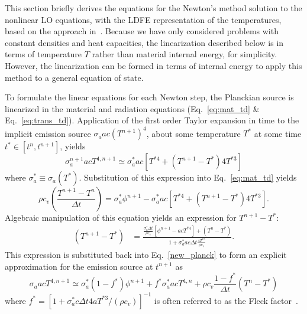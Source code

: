 This section briefly derives the equations for the Newton's method solution to the nonlinear LO equations, with the LDFE representation of the temperatures, based on the approach in~\cite{morel_ldtrt}.
Because we have only considered problems with constant densities and heat capacities, the
linearization described below is in terms of temperature $T$ rather than material internal
energy, for simplicity. However, the linearization can be formed in terms of internal energy
to apply this method to a general equation of state.

To formulate the linear equations for each Newton step, the Planckian source is linearized in the material and radiation equations (Eq.~\eqref{eq:mat_td}
\& Eq.~\eqref{eq:trans_td}). 
Application of the first order Taylor expansion in time to the
implicit emission source $\sigma_a a c (T^{n+1})^4$, about some temperature $T^*$ at some
time $t^*\in[t^{n},t^{n+1}]$, yields
\begin{equation}\label{new_planck}
    \sigma_a^{n+1} a c T^{4,n+1} \simeq \sigma_a^* a c \left[T^{*4} + (T^{n+1} - T^*) 4T^{*3} \right]
\end{equation}
where $\sigma_a^*\equiv\sigma_a(T^*)$.  Substitution of this expression into Eq.~\eqref{eq:mat_td} yields
\begin{equation}
    \rho c_v \left( \frac{T^{n+1} - T^{n}}{\Delta t} \right) = \sigma_a^* \phi^{n+1} -
    \sigma_a^* a c \left[ T^{*4} +  (T^{n+1} - T^*) 4T^{*3} \right].
\end{equation}
Algebraic manipulation of this equation yields an expression for $T^{n+1} - T^{*}$:
\begin{align*}
\left( T^{n+1} - T^* \right) &= \frac{ {\displaystyle \frac{\sigma_a^* \Delta t}{\rho
c_v}}  \left[ \phi^{n+1} -  a c T^{*4} \right] + (T^n - T^*) }{1 +
        \sigma_a^* a c \Delta t\frac{\displaystyle 4
T^{*3}}{\displaystyle \rho c_v } }.
\end{align*}
This expression is substituted back into Eq.~\eqref{new_planck} to form
an explicit approximation for the emission source at $t^{n+1}$ as
\begin{equation}\label{t_next1}
    \sigma_a a c T^{4,n+1} \simeq \sigma_a^* (1 -f^*) \phi^{n+1}
    + f^* \sigma_a^* a c T^{4,n} + \rho c_v\frac{1-f^*}{\Delta t} (T^n - T^*)
\end{equation}
where $f^* = [1 + \sigma_a^* c \Delta t 4 a T^{*3}/(\rho c_v)]^{-1}$ is often referred to
as the Fleck factor~\cite{fnc}. 

